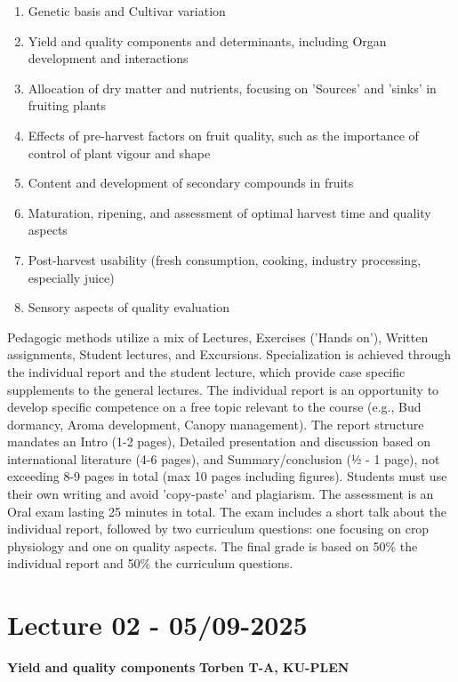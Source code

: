 \begin{enumerate}
    \item Genetic basis and Cultivar variation
    \item Yield and quality components and determinants, including Organ development and interactions
    \item Allocation of dry matter and nutrients, focusing on 'Sources' and 'sinks' in fruiting plants
    \item Effects of pre-harvest factors on fruit quality, such as the importance of control of plant vigour and shape
    \item Content and development of secondary compounds in fruits
    \item Maturation, ripening, and assessment of optimal harvest time and quality aspects
    \item Post-harvest usability (fresh consumption, cooking, industry processing, especially juice)
    \item Sensory aspects of quality evaluation
\end{enumerate}

Pedagogic methods utilize a mix of Lectures, Exercises ('Hands on'), Written assignments, Student lectures, and Excursions. Specialization is achieved through the individual report and the student lecture, which provide case specific supplements to the general lectures. The individual report is an opportunity to develop specific competence on a free topic relevant to the course (e.g., Bud dormancy, Aroma development, Canopy management). The report structure mandates an Intro (1-2 pages), Detailed presentation and discussion based on international literature (4-6 pages), and Summary/conclusion (½ - 1 page), not exceeding 8-9 pages in total (max 10 pages including figures). Students must use their own writing and avoid 'copy-paste' and plagiarism.
The assessment is an Oral exam lasting 25 minutes in total. The exam includes a short talk about the individual report, followed by two curriculum questions: one focusing on crop physiology and one on quality aspects. The final grade is based on 50\% the individual report and 50\% the curriculum questions.

\section{Lecture 02 - 05/09-2025}
\textbf{Yield and quality components}
\textbf{Torben T-A, KU-PLEN}

